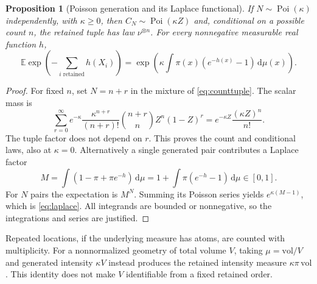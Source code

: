 \documentclass[11pt]{article}
\newtheorem{proposition}[theorem]{Proposition}
\theoremstyle{remark}
\newcommand{\E}{\mathbb E}
\newcommand{\Poi}{\operatorname{Poi}}
\newcommand{\dd}{\,\mathrm d}
\begin{document}
\begin{proposition}[Poisson generation and its Laplace functional]
\label{prop:poisson}
If $N\sim\Poi(\kappa)$ independently, with $\kappa\ge0$, then
$C_N\sim\Poi(\kappa Z)$ and, conditional on a possible count $n$, the
retained tuple has law $\nu^{\otimes n}$. For every nonnegative measurable
real function $h$,
\begin{equation}\label{eq:laplace}
 \E\exp\left(-\sum_{i\text{ retained}}h(X_i)\right)
 =\exp\left(\kappa\int\pi(x)(e^{-h(x)}-1)\dd\mu(x)\right).
\end{equation}
\end{proposition}
\begin{proof}
For fixed $n$, set $N=n+r$ in the mixture of \eqref{eq:counttuple}.
The scalar mass is
\[
 \sum_{r=0}^\infty e^{-\kappa}\frac{\kappa^{n+r}}{(n+r)!}
 \binom{n+r}{n}Z^n(1-Z)^r
 =e^{-\kappa Z}\frac{(\kappa Z)^n}{n!}.
\]
The tuple factor does not depend on $r$. This proves the count and
conditional laws, also at $\kappa=0$. Alternatively a single generated
pair contributes a Laplace factor
\[
 M=\int(1-\pi+\pi e^{-h})\dd\mu
   =1+\int\pi(e^{-h}-1)\dd\mu\in[0,1].
\]
For $N$ pairs the expectation is $M^N$. Summing its Poisson series yields
$e^{\kappa(M-1)}$, which is \eqref{eq:laplace}. All integrands are
bounded or nonnegative, so the integrations and series are justified.
\end{proof}

Repeated locations, if the underlying measure has atoms, are counted with
multiplicity. For a nonnormalized geometry of total volume $V$, taking
$\mu=\mathrm{vol}/V$ and generated intensity $\kappa V$ instead produces
the retained intensity measure $\kappa\pi\,\mathrm{vol}$. This identity
does not make $V$ identifiable from a fixed retained order.
\end{document}
